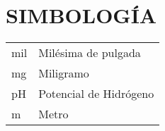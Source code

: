 \chapter{SIMBOLOG\'IA}
\renewcommand{\arraystretch}{1.5}
\begin{table}[htbp]
\begin{tabular}{ll}
mil   & Mil\'esima de pulgada   \\
mg    & Miligramo \\
pH    & Potencial de Hidr\'ogeno        \\
m     & Metro      
\end{tabular}
\end{table}